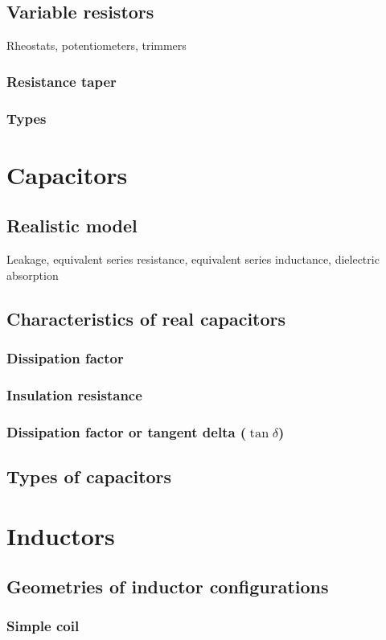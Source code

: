 \documentclass{report}
\begin{document}
\subsection{Variable resistors}
Rheostats, potentiometers, trimmers
\subsubsection{Resistance taper}
\subsubsection{Types}
\section{Capacitors}
\subsection{Realistic model}
Leakage, equivalent series resistance, equivalent series inductance, dielectric absorption
\subsection{Characteristics of real capacitors}
\subsubsection{Dissipation factor}
\subsubsection{Insulation resistance}
\subsubsection{Dissipation factor or tangent delta ($\tan \delta$)}
\subsection{Types of capacitors}
\section{Inductors}
\subsection{Geometries of inductor configurations}
\subsubsection{Simple coil}
\end{document}
